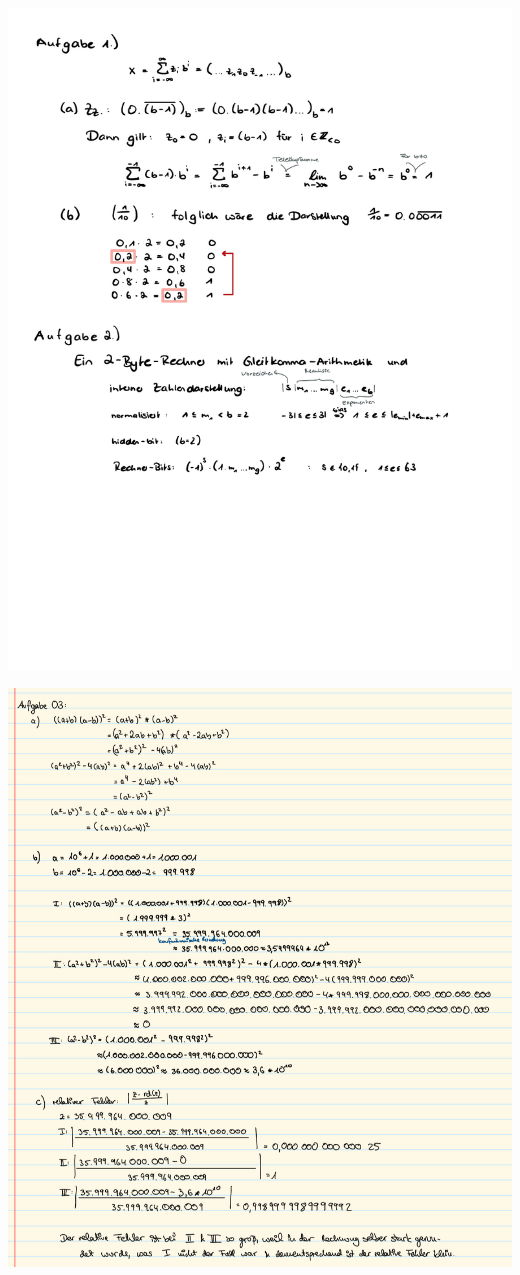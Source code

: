 \documentclass[a4paper,oneside,11pt]{scrartcl}
\begin{document}
\begin{minipage}[t]{\textwidth}
\includegraphics[scale = 0.75, page=3]{AlMa_blatt02.pdf}
\end{minipage}
\pagebreak
\begin{minipage}[t]{\textwidth}
\includegraphics[scale = 0.7, page=1]{AlMa1_blatt02_a3.png}
\end{minipage}
\end{document}
